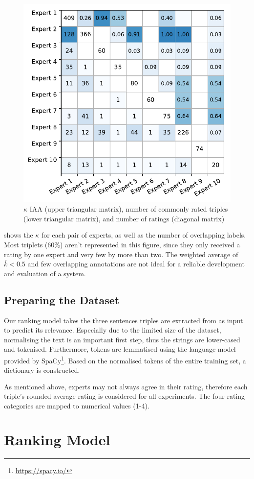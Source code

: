 \begin{figure}
	\includegraphics[width=0.7\linewidth]{iaa}
	\caption{$\kappa$ IAA (upper triangular matrix), number of commonly rated triples (lower triangular matrix), and number of ratings (diagonal matrix)}
	\label{fig:iaa}
\end{figure}

 shows the $\kappa$ for each pair of experts, as well as the number of overlapping labels. Most triplets (60\%) aren't represented in this figure, since they only received a rating by one expert and very few by more than two. The weighted average of $\overline{k}<0.5$ and few overlapping annotations are not ideal for a reliable development and evaluation of a system.

\subsection{Preparing the Dataset}
Our ranking model takes the three sentences triples are extracted from as input to predict its relevance. Especially due to the limited size of the dataset, normalising the text is an important first step, thus the strings are lower-cased and tokenised. Furthermore, tokens are lemmatised using the language model provided by SpaCy\footnote{\url{https://spacy.io/}}. Based on the normalised tokens of the entire training set, a dictionary is constructed.

As mentioned above, experts may not always agree in their rating, therefore each triple's rounded average rating is considered for all experiments. The four rating categories are mapped to numerical values (1-4).

\section{Ranking Model}


